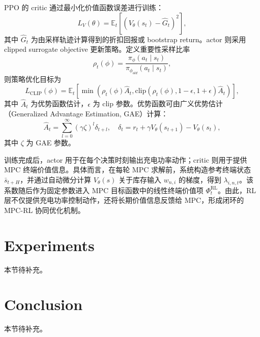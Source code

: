 \documentclass[12pt,hyperref,a4paper,UTF8]{ctexart}
\begin{document}
PPO 的 critic 通过最小化价值函数误差进行训练：
\begin{equation}
L_V(\theta)=
\mathbb{E}_t\left[
\left(V_{\theta}(s_t)-\hat{G}_t\right)^2
\right],
\label{eq:value_loss}
\end{equation}
其中 $\hat{G}_t$ 为由采样轨迹计算得到的折扣回报或 bootstrap return。actor 则采用 clipped surrogate objective 更新策略。定义重要性采样比率
\begin{equation}
\rho_t(\phi)=
\frac{\pi_{\phi}(a_t\mid s_t)}{\pi_{\phi_{old}}(a_t\mid s_t)},
\label{eq:ppo_ratio}
\end{equation}
则策略优化目标为
\begin{equation}
L_{\mathrm{CLIP}}(\phi)=
\mathbb{E}_t\left[
\min\left(
\rho_t(\phi)\hat{A}_t,
\mathrm{clip}(\rho_t(\phi),1-\epsilon,1+\epsilon)\hat{A}_t
\right)
\right],
\label{eq:ppo_clip}
\end{equation}
其中 $\hat{A}_t$ 为优势函数估计，$\epsilon$ 为 clip 参数。优势函数可由广义优势估计（Generalized Advantage Estimation, GAE）计算：
\begin{equation}
\hat{A}_t=\sum_{l=0}^{\infty}(\gamma\zeta)^l\delta_{t+l},
\quad
\delta_t=r_t+\gamma V_{\theta}(s_{t+1})-V_{\theta}(s_t),
\label{eq:gae}
\end{equation}
其中 $\zeta$ 为 GAE 参数。

训练完成后，actor 用于在每个决策时刻输出充电功率动作；critic 则用于提供 MPC 终端价值信息。具体而言，在每轮 MPC 求解前，系统构造参考终端状态 $\bar{s}_{t+H}$，并通过自动微分计算 $V_{\theta}(s)$ 关于库存输入 $w_{n,i}$ 的梯度，得到 $\lambda_{i,n,t}$。该系数随后作为固定参数进入 MPC 目标函数中的线性终端价值项 $\Phi_t^{\mathrm{RL}}$。由此，RL 层不仅提供充电功率控制动作，还将长期价值信息反馈给 MPC，形成闭环的 MPC-RL 协同优化机制。

\section{Experiments}

本节待补充。

\section{Conclusion}

本节待补充。


\end{document}
